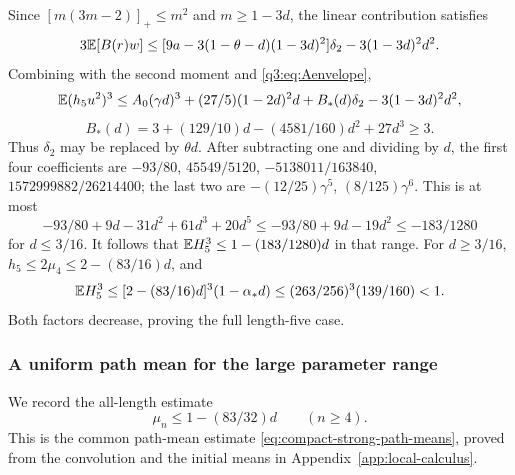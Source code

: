 Since $[m(3m-2)]_+\le m^2$ and $m\ge1-3d$, the linear contribution satisfies
\[
 3\mathbb E[B(r)w]\le[9a-3(1-\theta-d)(1-3d)^2]\delta_{2}
                       -3(1-3d)^2d^2.
\]
Combining with the second moment and \eqref{q3:eq:Aenvelope},
\[
 \mathbb E(h_5u^2)^3\le A_0(\gamma d)^3+(27/5)(1-2d)^2d
          +B_*(d)\delta_{2}-3(1-3d)^2d^2,
\]
\[
 B_*(d)=3+(129/10)d-(4581/160)d^2+27d^3\ge3.
\]
Thus $\delta_{2}$ may be replaced by $\theta d$. After subtracting one and dividing by $d$, the first four coefficients are
$-93/80$, $45549/5120$, $-5138011/163840$, $1572999882/26214400$;
the last two are $-(12/25)\gamma^5$, $(8/125)\gamma^6$.
This is at most
\[
 -93/80+9d-31d^2+61d^3+20d^5
 \le-93/80+9d-19d^2\le-183/1280
\]
for $d\le3/16$. It follows that $\mathbb E H_5^3\le1-(183/1280)d$ in that range.
For $d\ge3/16$, $h_5\le2\mu_4\le2-(83/16)d$, and
\begin{equation}\label{q3:eq:largetriple}
 \mathbb E H_5^3\le[2-(83/16)d]^3(1-\alpha_*d)
 \le(263/256)^3(139/160)<1 .
\end{equation}
Both factors decrease, proving the full length-five case.

\subsubsection{A uniform path mean for the large parameter range}
We record the all-length estimate
\begin{equation}\label{q3:eq:uniformmean}
 \mu_n\le1-(83/32)d\qquad(n\ge4).
\end{equation}
This is the common path-mean estimate
\eqref{eq:compact-strong-path-means}, proved from the convolution and
the initial means in Appendix~\ref{app:local-calculus}.
